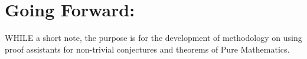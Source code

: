 \documentclass[10pt]{article}
\theoremstyle{plain}
\theoremstyle{definition}
\theoremstyle{remark}
\begin{document}
	\section{Going Forward:}
	\lettrine[lines=1, lhang=0.1, loversize=0.2]{W}HILE a short note, the purpose is for the development of methodology on using proof assistants for non-trivial conjectures and theorems of Pure Mathematics.
	
\nocite{*}
	


	
	
\end{document}
